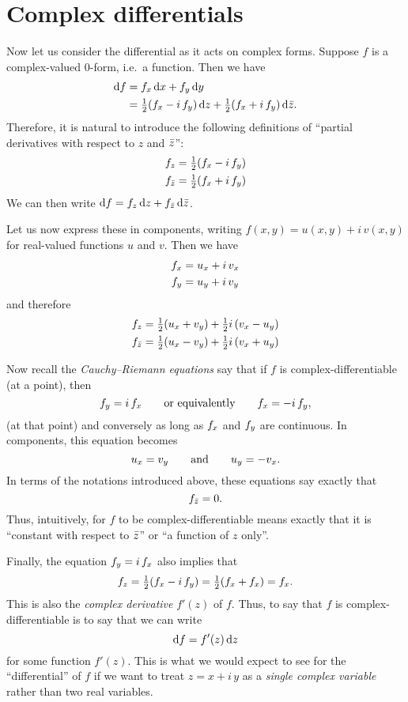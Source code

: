 \documentclass[12pt]{amsart}
\begin{document}
\section{Complex differentials}
\label{sec:complex-differentials}

Now let us consider the differential as it acts on complex forms.
Suppose $f$ is a complex-valued 0-form, i.e.\ a function.
Then we have
\begin{align*}
  {\ensuremath{\mathrm{d} f}} &= {f}_{x} \, {\mathrm{d} x} + {f}_{y}\,{\mathrm{d} y}\\
  &= \textstyle\frac{1}{2} ({f}_{x} - i\, {f}_{y})\,{\mathrm{d} z} + \textstyle\frac{1}{2} ({f}_{x} + i\, {f}_{y})\,{\mathrm{d} \bar{z}}.
\end{align*}
Therefore, it is natural to introduce the following definitions of ``partial derivatives with respect to $z$ and $\bar{z}$'':
\begin{align*}
  {f}_{z} &= \textstyle\frac{1}{2} ({f}_{x} - i\, {f}_{y})\\
  {f}_{\bar{z}} &= \textstyle\frac{1}{2} ({f}_{x} + i\, {f}_{y})
\end{align*}
We can then write ${\mathrm{d} f} = {f}_{z} \,{\mathrm{d} z} + {f}_{\bar{z}} \,{\mathrm{d} \bar{z}}$.

Let us now express these in components, writing $f(x,y) = u(x,y) + i\,v(x,y)$ for real-valued functions $u$ and $v$.
Then we have
\begin{align*}
  {f}_{x} &= {u}_{x} + i\, {v}_{x}\\
  {f}_{y} &= {u}_{y} + i\, {v}_{y}
\end{align*}
and therefore
\begin{align*}
  {f}_{z} &= \textstyle\frac{1}{2} ({u}_{x} + {v}_{y}) + \textstyle\frac{1}{2} i\, ({v}_{x} - {u}_{y})\\
  {f}_{\bar{z}} &= \textstyle\frac{1}{2} ({u}_{x} - {v}_{y}) + \textstyle\frac{1}{2} i\, ({v}_{x} + {u}_{y})
\end{align*}

Now recall the \emph{Cauchy--Riemann equations} say that if $f$ is complex-differentiable (at a point), then
\[ {f}_{y} = i\,{f}_{x} \qquad\text{or equivalently}\qquad {f}_{x} = - i\,{f}_{y},\]
(at that point) and conversely as long as ${f}_{x}$ and ${f}_{y}$ are continuous.
In components, this equation becomes
\[ {u}_{x} = {v}_{y} \qquad\text{and}\qquad {u}_{y} = - {v}_{x}. \]
In terms of the notations introduced above, these equations say exactly that
\[ {f}_{\bar{z}} = 0. \]
Thus, intuitively, for $f$ to be complex-differentiable means exactly that it is ``constant with respect to $\bar{z}$'' or ``a function of $z$ only''.

Finally, the equation ${f}_{y} = i\,{f}_{x}$ also implies that
\[ {f}_{z} = \textstyle\frac{1}{2}({f}_{x} - i\,{f}_{y}) = \textstyle\frac{1}{2} ({f}_{x} + {f}_{x}) = {f}_{x}.\]
This is also the \emph{complex derivative} $f'(z)$ of $f$.
Thus, to say that $f$ is complex-differentiable is to say that we can write
\[ {\mathrm{d} f} = f'(z) \,{\mathrm{d} z} \]
for some function $f'(z)$.
This is what we would expect to see for the ``differential'' of $f$ if we want to treat $z = x+i\,y$ as a \emph{single complex variable} rather than two real variables.
\end{document}
